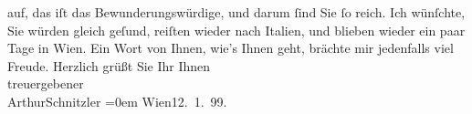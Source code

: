 \begin{ledgroupsized}[t]{13cm}
               auf, das iſt das Bewunderungswürdige, und darum {\pb}ſind Sie ſo reich.\pend
           \pstart
           Ich wünſchte, Sie würden gleich geſund, reiſten wieder nach Italien, und blieben wieder ein paar Tage in Wien. Ein Wort von Ihnen, wie’s Ihnen geht, brächte mir
               jedenfalls viel Freude.\pend
           \pstart
           Herzlich grüßt Sie Ihr Ihnen {\\[\baselineskip]}treuergebener{\\[\baselineskip]}\spacefill\mbox{ArthurSchnitzler}\pend
           \leftskip=0em{}\pstart
           Wien12. 1. 99.\pend
           
         
         \endnumbering{}\end{ledgroupsized}  \newcommand{\dateiname}{L00880}\newcommand{\titel}{Arthur Schnitzler an Georg Brandes, 12. 1. 1899}\newcommand{\editorInnen}{Martin Anton Müller und Gerd-Hermann Susen}
      